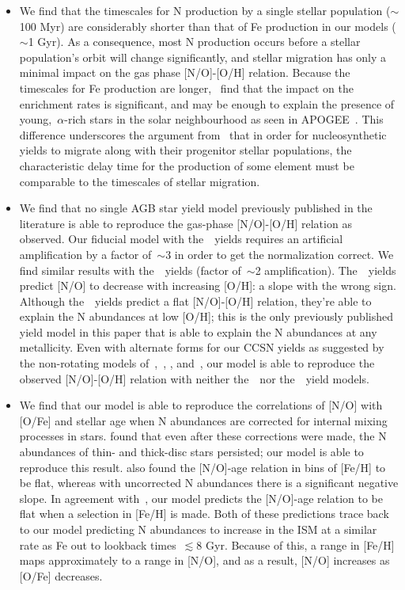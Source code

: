 \documentclass[ms.tex]{subfiles}
\begin{document}
\begin{itemize}
	\item We find that the timescales for N production by a single stellar 
	population ($\sim$100 Myr) are considerably shorter than that of Fe 
	production in our models ($\sim$1 Gyr). 
	As a consequence, most N production occurs before a stellar population's 
	orbit will change significantly, and stellar migration has only a minimal 
	impact on the gas phase [N/O]-[O/H] relation. 
	Because the timescales for Fe production are longer,~\citet{Johnson2021} 
	find that the impact on the enrichment rates is significant, and may be 
	enough to explain the presence of young,~$\alpha$-rich stars in the solar 
	neighbourhood as seen in APOGEE~\citep{Chiappini2015, Martig2015, 
	Martig2016, Jofre2016, Yong2016, Izzard2018, SilvaAguirre2018, 
	Warfield2021}. 
	This difference underscores the argument from~\citet{Johnson2021} that in 
	order for nucleosynthetic yields to migrate along with their progenitor 
	stellar populations, the characteristic delay time for the production of 
	some element must be comparable to the timescales of stellar migration. 

	\item We find that no single AGB star yield model previously published in 
	the literature is able to reproduce the gas-phase [N/O]-[O/H] relation as 
	observed. 
	Our fiducial model with the~\cristallo~yields requires an artificial 
	amplification by a factor of~$\sim$3 in order to get the normalization 
	correct. 
	We find similar results with the~\ventura~yields (factor of~$\sim$2 
	amplification). 
	The~\karakasten~yields predict [N/O] to decrease with increasing [O/H]: a 
	slope with the wrong sign. 
	Although the~\karakas~yields predict a flat [N/O]-[O/H] relation, they're 
	able to explain the N abundances at low [O/H]; this is the only previously 
	published yield model in this paper that is able to explain the N 
	abundances at any metallicity. 
	Even with alternate forms for our CCSN yields as suggested by the 
	non-rotating models of~\citet{Woosley1995},~\citet{Nomoto2013}, 
	\citet{Sukhbold2016}, and~\citet{Limongi2018}, our model is able to 
	reproduce the observed [N/O]-[O/H] relation with neither 
	the~\karakasten~nor the~\karakas~yield models. 

	\item We find that our model is able to reproduce the correlations of [N/O] 
	with [O/Fe] and stellar age when N abundances are corrected for internal 
	mixing processes in stars. 
	\citet{Vincenzo2021} found that even after these corrections were made, the 
	N abundances of thin- and thick-disc stars persisted; our model is able to 
	reproduce this result. 
	\citet{Vincenzo2021} also found the [N/O]-age relation in bins of [Fe/H] to 
	be flat, whereas with uncorrected N abundances there is a significant 
	negative slope. 
	In agreement with~\citet{Vincenzo2021}, our model predicts the [N/O]-age 
	relation to be flat when a selection in [Fe/H] is made. 
	Both of these predictions trace back to our model predicting N abundances 
	to increase in the ISM at a similar rate as Fe out to lookback 
	times~$\lesssim$8 Gyr. 
	Because of this, a range in [Fe/H] maps approximately to a range in [N/O], 
	and as a result, [N/O] increases as [O/Fe] decreases. 


\end{itemize}
\end{document}
